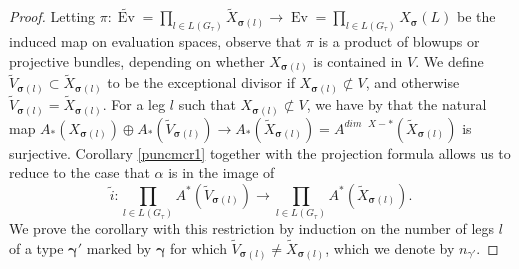 \documentclass[12pt, oneside]{amsart}   	%
\newcommand{\Ev}{\operatorname{Ev}}
\numberwithin{equation}{section}
\numberwithin{thm}{section}
\numberwithin{figure}{section}
\begin{document}
\begin{proof}
Letting $\pi: \widetilde{\Ev} = \prod_{l \in L(G_{\tau})} \widetilde{X}_{\pmb\sigma(l)} \rightarrow \Ev = \prod_{l \in L(G_{\tau})} X_{\pmb\sigma}(L)$ be the induced map on evaluation spaces, observe that $\pi$ is a product of blowups or projective bundles, depending on whether $X_{\pmb\sigma(l)}$ is contained in $V$. We define $\widetilde{V}_{\pmb\sigma(l)} \subset \widetilde{X}_{\pmb\sigma(l)}$ to be the exceptional divisor if $X_{\pmb\sigma(l)} \not\subset V$, and otherwise $\widetilde{V}_{\pmb\sigma(l)} = \widetilde{X}_{\pmb\sigma(l)}$. For a leg $l$ such that $X_{\pmb\sigma(l)}\not\subset V$, we have by \cite[Proposition $6.7(e)$]{Fulint} that the natural map $A_*(X_{\pmb\sigma(l)})\oplus A_*(\widetilde{V}_{\pmb\sigma(l)}) \rightarrow A_*(\widetilde{X}_{\pmb\sigma(l)}) = A^{dim\text{ }X-*}(\widetilde{X}_{\pmb\sigma(l)})$ is surjective. Corollary \ref{puncmcr1} together with the projection formula allows us to reduce to the case that $\alpha$ is in the image of 
$$\tilde{i}: \prod_{l \in L(G_{\tau})} A^*(\widetilde{V}_{\pmb\sigma(l)}) \rightarrow \prod_{l \in L(G_{\tau})} A^*(\widetilde{X}_{\pmb\sigma(l)}).$$
We prove the corollary with this restriction by induction on the number of legs $l$ of a type $\pmb\gamma'$ marked by $\pmb\gamma$ for which $\widetilde{V}_{\pmb\sigma(l)} \not= \widetilde{X}_{\pmb\sigma(l)}$, which we denote by $n_{\gamma'}$. 




\end{proof}
\end{document}
